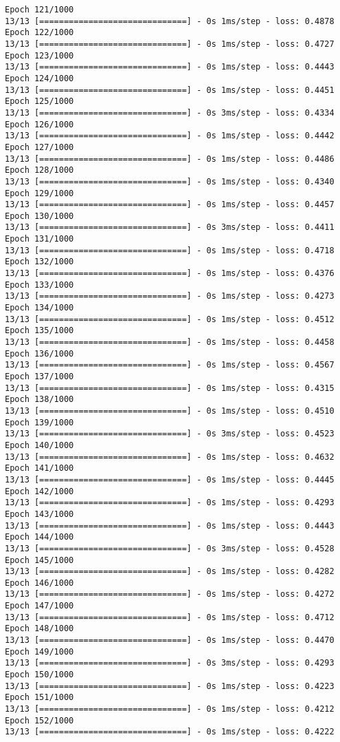 \documentclass[11pt]{article}
\begin{document}
\begin{Verbatim}[commandchars=\\\{\}]
Epoch 121/1000
13/13 [==============================] - 0s 1ms/step - loss: 0.4878
Epoch 122/1000
13/13 [==============================] - 0s 1ms/step - loss: 0.4727
Epoch 123/1000
13/13 [==============================] - 0s 1ms/step - loss: 0.4443
Epoch 124/1000
13/13 [==============================] - 0s 1ms/step - loss: 0.4451
Epoch 125/1000
13/13 [==============================] - 0s 3ms/step - loss: 0.4334
Epoch 126/1000
13/13 [==============================] - 0s 1ms/step - loss: 0.4442
Epoch 127/1000
13/13 [==============================] - 0s 1ms/step - loss: 0.4486
Epoch 128/1000
13/13 [==============================] - 0s 1ms/step - loss: 0.4340
Epoch 129/1000
13/13 [==============================] - 0s 1ms/step - loss: 0.4457
Epoch 130/1000
13/13 [==============================] - 0s 3ms/step - loss: 0.4411
Epoch 131/1000
13/13 [==============================] - 0s 1ms/step - loss: 0.4718
Epoch 132/1000
13/13 [==============================] - 0s 1ms/step - loss: 0.4376
Epoch 133/1000
13/13 [==============================] - 0s 1ms/step - loss: 0.4273
Epoch 134/1000
13/13 [==============================] - 0s 1ms/step - loss: 0.4512
Epoch 135/1000
13/13 [==============================] - 0s 1ms/step - loss: 0.4458
Epoch 136/1000
13/13 [==============================] - 0s 1ms/step - loss: 0.4567
Epoch 137/1000
13/13 [==============================] - 0s 1ms/step - loss: 0.4315
Epoch 138/1000
13/13 [==============================] - 0s 1ms/step - loss: 0.4510
Epoch 139/1000
13/13 [==============================] - 0s 3ms/step - loss: 0.4523
Epoch 140/1000
13/13 [==============================] - 0s 1ms/step - loss: 0.4632
Epoch 141/1000
13/13 [==============================] - 0s 1ms/step - loss: 0.4445
Epoch 142/1000
13/13 [==============================] - 0s 1ms/step - loss: 0.4293
Epoch 143/1000
13/13 [==============================] - 0s 1ms/step - loss: 0.4443
Epoch 144/1000
13/13 [==============================] - 0s 3ms/step - loss: 0.4528
Epoch 145/1000
13/13 [==============================] - 0s 1ms/step - loss: 0.4282
Epoch 146/1000
13/13 [==============================] - 0s 1ms/step - loss: 0.4272
Epoch 147/1000
13/13 [==============================] - 0s 1ms/step - loss: 0.4712
Epoch 148/1000
13/13 [==============================] - 0s 1ms/step - loss: 0.4470
Epoch 149/1000
13/13 [==============================] - 0s 3ms/step - loss: 0.4293
Epoch 150/1000
13/13 [==============================] - 0s 1ms/step - loss: 0.4223
Epoch 151/1000
13/13 [==============================] - 0s 1ms/step - loss: 0.4212
Epoch 152/1000
13/13 [==============================] - 0s 1ms/step - loss: 0.4222

\end{Verbatim}
\end{document}
